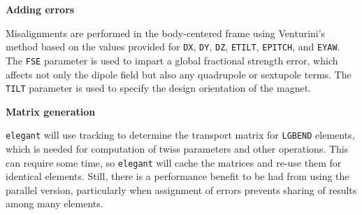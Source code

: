 {\bf Adding errors}

Misalignments are performed in the body-centered frame using Venturini's method \cite{Venturini2021}
based on the values provided for \verb|DX|, \verb|DY|, \verb|DZ|, \verb|ETILT|, \verb|EPITCH|, 
and \verb|EYAW|.
The \verb|FSE| parameter is used to impart a global fractional strength error, which affects not only
the dipole field but also any quadrupole or sextupole terms.
The \verb|TILT| parameter is used to specify the design orientation of the magnet.

{\bf Matrix generation}

{\tt elegant} will use tracking to determine the transport matrix for \verb|LGBEND| elements, which 
is needed for computation of twiss parameters and other operations.
This can require some time, so {\tt elegant} will cache the matrices and re-use them for
identical elements.
Still, there is a performance benefit to be had from using the parallel version, particularly
when assignment of errors prevents sharing of results among many elements.

